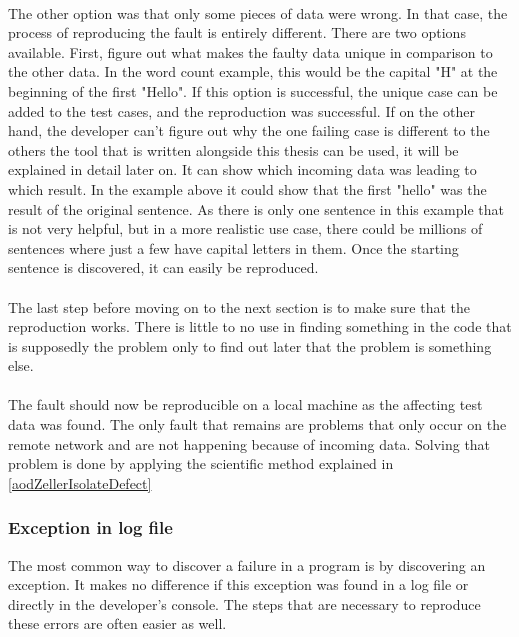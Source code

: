 \paragraph{} The other option was that only some pieces of data were wrong. In that case, the process of reproducing the fault is entirely different. There are two options available. First, figure out what makes the faulty data unique in comparison to the other data. In the word count example, this would be the capital "H" at the beginning of the first "Hello". If this option is successful, the unique case can be added to the test cases, and the reproduction was successful. If on the other hand, the developer can't figure out why the one failing case is different to the others the tool that is written alongside this thesis can be used, it will be explained in detail later on. It can show which incoming data was leading to which result. In the example above it could show that the first "hello" was the result of the original sentence. As there is only one sentence in this example that is not very helpful, but in a more realistic use case, there could be millions of sentences where just a few have capital letters in them. Once the starting sentence is discovered, it can easily be reproduced.

\paragraph{} The last step before moving on to the next section is to make sure that the reproduction works. There is little to no use in finding something in the code that is supposedly the problem only to find out later that the problem is something else.

\paragraph{} The fault should now be reproducible on a local machine as the affecting test data was found. The only fault that remains are problems that only occur on the remote network and are not happening because of incoming data. Solving that problem is done by applying the scientific method explained in \ref{aodZellerIsolateDefect}

\subsubsection{Exception in log file}
The most common way to discover a failure in a program is by discovering an exception. It makes no difference if this exception was found in a log file or directly in the developer's console. The steps that are necessary to reproduce these errors are often easier as well.

